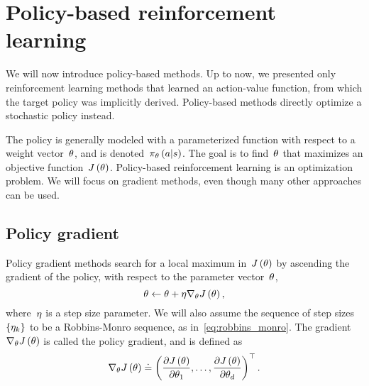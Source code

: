 \chapter{Policy-based reinforcement learning} \label{ch:policy_based_rl}
We will now introduce policy-based methods. Up to now, we presented only reinforcement learning methods that learned an action-value function, from which the target policy was implicitly derived. Policy-based methods directly optimize a stochastic policy instead.

The policy is generally modeled with a parameterized function with respect to a weight vector~${\theta}$, and is denoted~${\policy_{\policyparameter}\left(\action\middle\vert\state\right)}$. The goal is to find~${\theta}$ that maximizes an objective function~${J\left(\theta\right)}$. Policy-based reinforcement learning is an optimization problem. We will focus on gradient methods, even though many other approaches can be used.

\section{Policy gradient}
Policy gradient methods search for a local maximum in~${J\left(\theta\right)}$ by ascending the gradient of the policy, with respect to the parameter vector~${\theta}$,
\begin{equation}
	\theta\gets\theta+\eta\nabla_{\theta}J\left(\theta\right),
\end{equation}
where~${\eta}$ is a step size parameter. We will also assume the sequence of step sizes~${\left\{\eta_{k}\right\}}$ to be a Robbins-Monro sequence, as in~\eqref{eq:robbins_monro}. The gradient~${\nabla_{\theta}J\left(\theta\right)}$ is called the policy gradient, and is defined as
\begin{equation}
	\nabla_{\theta}J\left(\theta\right)\doteq\left(\frac{\partial J\left(\theta\right)}{\partial\theta_{1}},\dots,\frac{\partial J\left(\theta\right)}{\partial\theta_{d}}\right)^{\top}.
\end{equation}

